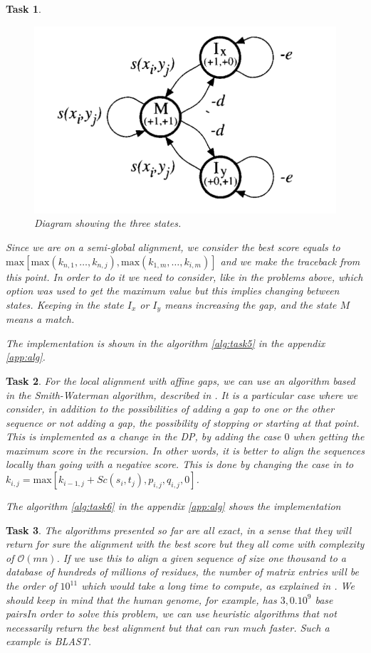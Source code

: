 \documentclass[11pt]{article} %
\theoremstyle{problemstyle}
\newtheorem{exercise}{Task}	%
\theoremstyle{problemstyle}
\renewcommand*{\O}{\mathcal{O}}
\begin{document}
\begin{exercise}
\begin{sloppypar}
\begin{figure}[h]
	\centerline{\includegraphics[width=0.5\linewidth]{automaton.png}}
	\caption{Diagram showing the three states.}
	\label{fig:automatom}
\end{figure}

Since we are on a semi-global alignment, we consider the best score equals to ${\text{max}[\text{max}(k_{n,1},\dots,k_{n,j}),\text{max}(k_{1,m},\dots ,k_{i,m})]}$ and we make the traceback from this point. In order to do it we need to consider, like in the problems above, which option was used to get the maximum value but this implies changing between states. Keeping in the state $I_x$ or $I_y$ means increasing the gap, and the state $M$ means a match.
\end{sloppypar}

The implementation is shown in the algorithm \ref{alg:task5} in the appendix \ref{app:alg}.

\end{exercise}

\begin{exercise} %
For the local alignment with affine gaps, we can use an algorithm based in the Smith-Waterman algorithm, described in \cite{durbin}. It is a particular case where we consider, in addition to the possibilities of adding a gap to one or the other sequence or not adding a gap, the possibility of stopping or starting at that point. This is implemented as a change in the DP, by adding the case $0$ when getting the maximum score in the recursion. In other words, it is better to align the sequences locally than going with a negative score. This is done by changing the case in  to ${k_{i,j}=\text{max}[k_{i-1,j}+Sc(s_i,t_j), p_{i,j}, q_{i,j},0]}$.

The algorithm \ref{alg:task6} in the appendix \ref{app:alg} shows the implementation

\end{exercise}

\begin{exercise} %
The algorithms presented so far are all exact, in a sense that they will return for sure the alignment with the best score but they all come with complexity of $\O(mn)$. If we use this to align a given sequence of size one thousand to a database of hundreds of millions of residues, the number of matrix entries will be the order of $10^{11}$ which would take a long time to compute, as explained in \cite{durbin}. We should keep in mind that the human genome, for example, has $3,0.10^9$ base pairsIn order to solve this problem, we can use heuristic algorithms that not necessarily return the best alignment but that can run much faster. Such a example is BLAST.
\end{exercise}
\end{document}
